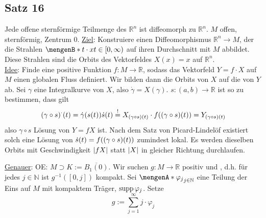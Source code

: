 \subsection{Satz 16} %
\label{sub:333}
Jede offene sternförmige Teilmenge des $\mathds{R}^n$ ist diffeomorph zu $\mathds{R}^n$.
$M$ offen, sternförmig, Zentrum $0$. \uline{Ziel}: Konstruiere einen Diffeomorphismus $\mathds{R}^n \to M$, der die Strahlen $\set[t \cdot x]{t \in [0,\infty)}$ auf ihren 
Durchschnitt mit $M$ abbildet. Diese Strahlen sind die Orbits des Vektorfeldes $X(x)=x$ auf $\mathds{R}^n$. \\
\uline{Idee}: Finde eine positive Funktion $f : M \to \mathds{R}$, sodass das Vektorfeld $Y = f \cdot X$ auf $M$ einen globalen Fluss definiert. Wir bilden dann die 
Orbits von $X$ auf die von $Y$ ab.
Sei $\gamma$ eine Integralkurve von $X$, also $\dot{\gamma} = X(\gamma)$. $s : (a,b) \to \mathds{R}$ ist so zu bestimmen, dass gilt 
\[
	(\gamma \circ s)^\cdot (t) = \dot{\gamma} \enbrace*{s(t)} \dot{s}(t) \stackrel{!}{=} X_{(\gamma \circ s)(t)} \cdot f \enbrace*{(\gamma \circ  s)(t)}  = Y_{(\gamma \circ s)(t)}
\]
also $\gamma \circ  s$ Lösung von $Y = f  X$ ist. Nach dem Satz von Picard-Lindelöf existiert solch eine Lösung von $\dot{s}(t)= f \enbrace*{(\gamma \circ s)(t)}$ zumindest
lokal. Es werden dieselben Orbits mit Geschwindigkeit $\abs*{f X} $ statt $\abs*{X}$ in gleicher Richtung durchlaufen.

\uline{Genauer}: OE: $M \supset K := \overline{B_1(0)}$. Wir suchen $g : M \to \mathds{R}$ positiv und , d.h. für jedes $j \in \mathds{N}$ ist 
$g ^{-1}([0,j])$ kompakt. Sei $\set{\varphi_j}_{j \in \mathds{N}}$ eine Teilung der Eins auf $M$ mit kompaktem Träger, $\supp \varphi_j$. Setze
\[
	g := \sum_{j=1}^{\infty} j \cdot \varphi_j
\]
\cleardoubleoddemptypage
{}
\setcounter{page}{1}
\printindex
\listoffigures

